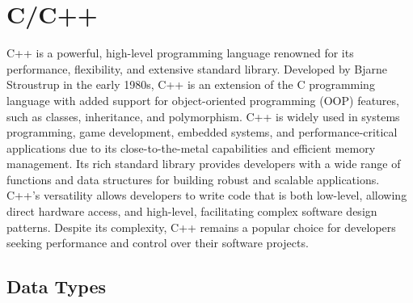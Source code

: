\chapter{C/C++}
\thispagestyle{fancy}
\lstset{}\lstset{language=C++, style=cppstyle}

C++ is a powerful, high-level programming language renowned for its performance, flexibility, and extensive standard library. Developed by Bjarne Stroustrup in the early 1980s, C++ is an extension of the C programming language with added support for object-oriented programming (OOP) features, such as classes, inheritance, and polymorphism. C++ is widely used in systems programming, game development, embedded systems, and performance-critical applications due to its close-to-the-metal capabilities and efficient memory management. Its rich standard library provides developers with a wide range of functions and data structures for building robust and scalable applications. C++'s versatility allows developers to write code that is both low-level, allowing direct hardware access, and high-level, facilitating complex software design patterns. Despite its complexity, C++ remains a popular choice for developers seeking performance and control over their software projects.

\section{Data Types}

